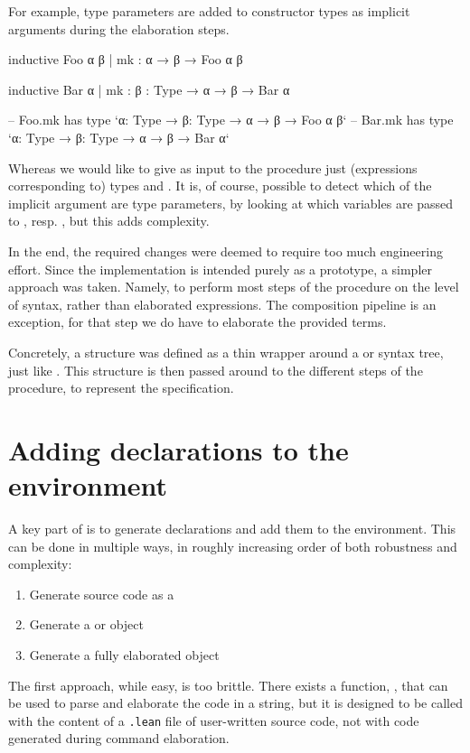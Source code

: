 For example, type parameters are added to constructor types as implicit arguments during the elaboration steps.
\begin{leancode}
    inductive Foo α β
      | mk : α → β → Foo α β

    inductive Bar α
      | mk : {β : Type} → α → β → Bar α

    -- Foo.mk has type `{α: Type} → {β: Type} → α → β → Foo α β`
    -- Bar.mk has type `{α: Type} → {β: Type} → α → β → Bar α`
\end{leancode}
Whereas we would like to give as input to the procedure just (expressions corresponding to) types  and .
It is, of course, possible to detect which of the implicit argument are type parameters, by looking at which variables are passed to , resp. , but this adds complexity.

In the end, the required changes were deemed to require too much engineering effort. 
Since the implementation is intended purely as a prototype, a simpler approach was taken. 
Namely, to  perform most steps of the procedure on the level of syntax, rather than elaborated expressions. 
The composition pipeline is an exception, for that step we do have to elaborate the provided terms.


Concretely, a  structure was defined as a thin wrapper around a \data{} or \codata{} syntax tree, just like .
This structure is then passed around to the different steps of the procedure, to represent the specification.



\section{Adding declarations to the environment}
A key part of  is to generate declarations and add them to the environment.
This can be done in multiple ways, in roughly increasing order of both robustness and complexity:
\begin{enumerate}
    \item Generate source code as a 
    \item Generate a  or  object
    \item Generate a fully elaborated  object
\end{enumerate}

The first approach, while easy, is too brittle. There exists a function, , that can be used to parse and elaborate the code in a string, but it is designed to be called with the content of a \texttt{.lean} file of user-written source code, not with code generated during command elaboration.

